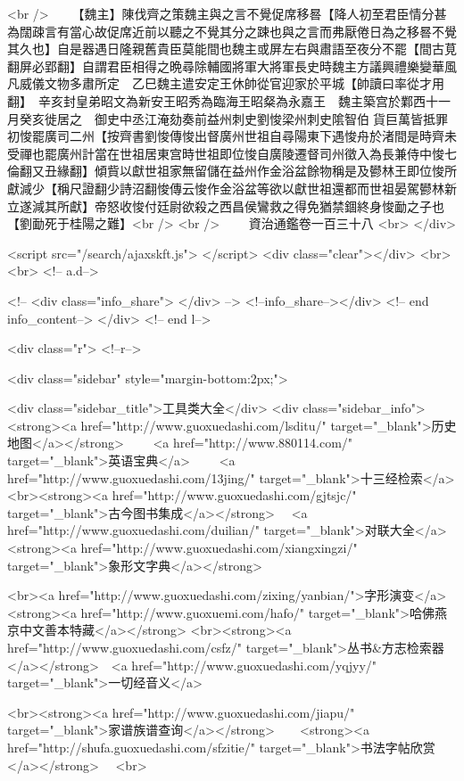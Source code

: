 <br />
　　【魏主】陳伐齊之策魏主與之言不覺促席移晷【降人初至君臣情分甚為闊疎言有當心故促席近前以聽之不覺其分之踈也與之言而弗厭倦日為之移晷不覺其久也】自是器遇日隆親舊貴臣莫能間也魏主或屏左右與肅語至夜分不罷【間古莧翻屏必郢翻】自謂君臣相得之晩尋除輔國將軍大將軍長史時魏主方議興禮樂變華風凡威儀文物多肅所定　乙巳魏主遣安定王休帥從官迎家於平城【帥讀曰率從才用翻】　辛亥封皇弟昭文為新安王昭秀為臨海王昭粲為永嘉王　魏主築宫於鄴西十一月癸亥徙居之　御史中丞江淹劾奏前益州刺史劉悛梁州刺史隂智伯貨巨萬皆抵罪初悛罷廣司二州【按齊書劉悛傳悛出督廣州世祖自尋陽東下遇悛舟於渚間是時齊未受禪也罷廣州計當在世祖居東宫時世祖即位悛自廣陵遷督司州徵入為長兼侍中悛七倫翻又丑緣翻】傾貲以獻世祖家無留儲在益州作金浴盆餘物稱是及鬰林王即位悛所獻減少【稱尺證翻少詩沼翻悛傳云悛作金浴盆等欲以獻世祖還都而世祖晏駕鬰林新立遂減其所獻】帝怒收悛付廷尉欲殺之西昌侯鸞救之得免猶禁錮終身悛勔之子也【劉勔死于桂陽之難】<br />
<br />
　　資治通鑑卷一百三十八  <br>
   </div> 

<script src="/search/ajaxskft.js"> </script>
 <div class="clear"></div>
<br>
<br>
 <!-- a.d-->

 <!--
<div class="info_share">
</div> 
-->
 <!--info_share--></div>   <!-- end info_content-->
  </div> <!-- end l-->

<div class="r">   <!--r-->



<div class="sidebar"  style="margin-bottom:2px;">

 
<div class="sidebar_title">工具类大全</div>
<div class="sidebar_info">
<strong><a href="http://www.guoxuedashi.com/lsditu/" target="_blank">历史地图</a></strong>　　
<a href="http://www.880114.com/" target="_blank">英语宝典</a>　　
<a href="http://www.guoxuedashi.com/13jing/" target="_blank">十三经检索</a>　
<br><strong><a href="http://www.guoxuedashi.com/gjtsjc/" target="_blank">古今图书集成</a></strong>　
<a href="http://www.guoxuedashi.com/duilian/" target="_blank">对联大全</a>　<strong><a href="http://www.guoxuedashi.com/xiangxingzi/" target="_blank">象形文字典</a></strong>　

<br><a href="http://www.guoxuedashi.com/zixing/yanbian/">字形演变</a>　　<strong><a href="http://www.guoxuemi.com/hafo/" target="_blank">哈佛燕京中文善本特藏</a></strong>
<br><strong><a href="http://www.guoxuedashi.com/csfz/" target="_blank">丛书&方志检索器</a></strong>　<a href="http://www.guoxuedashi.com/yqjyy/" target="_blank">一切经音义</a>　　

<br><strong><a href="http://www.guoxuedashi.com/jiapu/" target="_blank">家谱族谱查询</a></strong>　　<strong><a href="http://shufa.guoxuedashi.com/sfzitie/" target="_blank">书法字帖欣赏</a></strong>　
<br>

